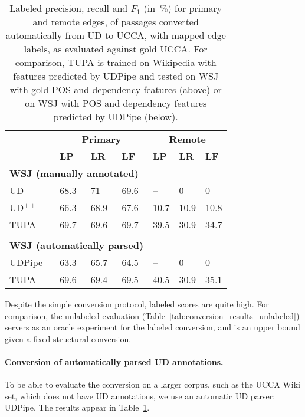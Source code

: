 \documentclass[11pt,a4paper]{article}
\begin{document}
\begin{table}[t]
\centering
\begin{tabular}{l|lll|lll}
& \multicolumn{3}{c|}{\footnotesize \bf Primary} & \multicolumn{3}{c}{\footnotesize \bf Remote} \\
& \footnotesize \textbf{LP} & \footnotesize \textbf{LR} & \footnotesize \textbf{LF}
& \footnotesize \textbf{LP} & \footnotesize \textbf{LR} & \footnotesize \textbf{LF} \\
\hline
\multicolumn{4}{l|}{\small \bf WSJ (manually annotated)} & \\
\footnotesize UD
& 68.3 & 71 & 69.6 & -- & 0 & 0 \\
\footnotesize UD$^{++}$
& 66.3 & 68.9 & 67.6 & 10.7 & 10.9 & 10.8 \\
\footnotesize TUPA
& 69.7 & 69.6 & 69.7 & 39.5 & 30.9 & 34.7 \\
\\
\multicolumn{4}{l|}{\small \bf WSJ (automatically parsed)} & \\
UDPipe & 63.3 & 65.7 & 64.5 & -- & 0 & 0 \\
\footnotesize TUPA
& 69.6 & 69.4 & 69.5 & 40.5 & 30.9 & 35.1
\end{tabular}
\caption{
Labeled precision, recall and $F_1$ (in~\%) for primary and remote edges,
of passages converted automatically from UD to UCCA,
with mapped edge labels, as evaluated against gold UCCA.
For comparison, TUPA \protect\cite{hershcovich2017a} is trained on Wikipedia with features predicted by UDPipe
and tested on WSJ with gold POS and dependency features (above)
or on WSJ with POS and dependency features predicted by UDPipe (below).
\label{tab:conversion_results_labeled}}
\end{table}

Despite the simple conversion protocol, labeled scores are quite high.
For comparison, the unlabeled evaluation (Table~\ref{tab:conversion_results_unlabeled})
servers as an oracle experiment for the labeled conversion,
and is an upper bound given a fixed structural conversion.

\paragraph{Conversion of automatically parsed UD annotations.}

To be able to evaluate the conversion on a larger corpus,
such as the UCCA Wiki set, which does not have UD annotations,
we use an automatic UD parser: UDPipe.
The results appear in Table~\ref{tab:conversion_results_labeled}.
\end{document}
